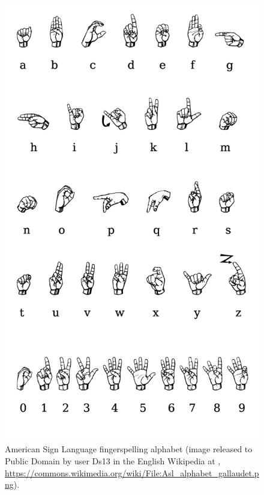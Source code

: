 \documentclass[output=paper]{langsci/langscibook}
\begin{document}
\begin{figure}[tb]
  \centering
  \includegraphics[width=0.5\linewidth]{figures/Asl-alphabet-gallaudet.png}
  \caption[ASL fingerspelling]{American Sign Language fingerspelling alphabet (image released to Public Domain by user Ds13 in the English Wikipedia at , \url{https://commons.wikimedia.org/wiki/File:Asl_alphabet_gallaudet.png}).}
  \label{fig:asl}
\end{figure}
\end{document}
